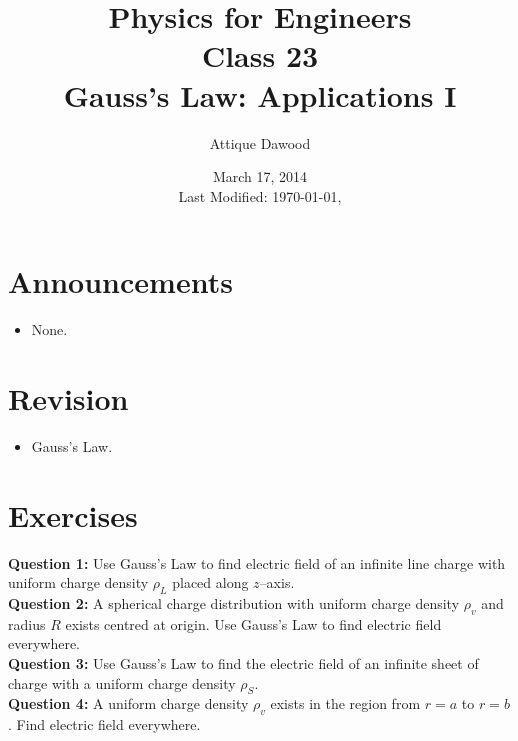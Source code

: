 \documentclass[12pt,a4paper]{article}
\title{\vspace{-3cm}Physics for Engineers\\Class 23\\Gauss's Law: Applications I}
\author{Attique Dawood}
\date{March 17, 2014\\[0.2cm] Last Modified: \today, \currenttime}
\begin{document}
\maketitle
\section{Announcements}
\begin{itemize}
\item None.
\end{itemize}
\section{Revision}
\begin{itemize}
\item Gauss's Law.
\end{itemize}
\section{Exercises}
\noindent\textbf{Question 1:} Use Gauss's Law to find electric field of an infinite line charge with uniform charge density $\rho_L$ placed along $z$--axis.\\[0.2cm]
\noindent\textbf{Question 2:} A spherical charge distribution with uniform charge density $\rho_v$ and radius $R$ exists centred at origin. Use Gauss's Law to find electric field everywhere.\\[0.2cm]
\noindent\textbf{Question 3:} Use Gauss's Law to find the electric field of an infinite sheet of charge with a uniform charge density $\rho_S$.\\[0.2cm]
\noindent\textbf{Question 4:} A uniform charge density $\rho_v$ exists in the region from $r=a$ to $r=b$. Find electric field everywhere.\\[0.2cm]
%
%
\end{document}

